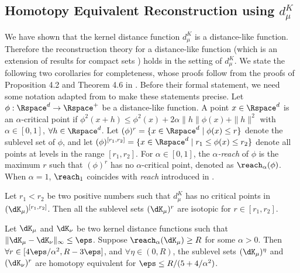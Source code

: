\documentclass[11pt]{myclass}
\begin{document}
\subsection{Homotopy Equivalent Reconstruction using $d^K_{\mu}$}

We have shown that the kernel distance function $d^K_{\mu}$ is a distance-like function.
Therefore the reconstruction theory for a distance-like function \cite{ChazalCohen-SteinerMerigot2011} (which is an extension of results for compact sets \cite{ChazalCohen-SteinerLieutier2009}) 
holds in the setting of $d^K_{\mu}$. 
We state the following two corollaries for completeness, whose proofs follow from the proofs of Proposition 4.2 and Theorem 4.6 in \cite{ChazalCohen-SteinerMerigot2011}.  
Before their formal statement, we need some notation adapted from \cite{ChazalCohen-SteinerMerigot2011} to make these statements precise.
Let $\phi: \Rspace^d \to \Rspace^+$ be a distance-like function. A point $x \in \Rspace^d$ is an $\alpha$-critical point if $\phi^2(x+h) \leq \phi^2(x) + 2\alpha \| h\| \phi(x) + \| h\|^2$ with $\alpha \in [0,1]$, $\forall h \in \Rspace^d$. 
Let $(\phi)^r = \{x \in \Rspace^d \mid \phi(x) \leq r\}$ denote the sublevel set of $\phi$, and let $(\phi)^{[r_1, r_2]} = \{x \in \Rspace^d \mid r_1 \leq \phi(x) \leq r_2\}$ denote all points at levels in the range $[r_1, r_2]$.  
For $\alpha \in [0,1]$, the \emph{$\alpha$-reach} of $\phi$ is the maximum $r$ such that $(\phi)^r$ has no $\alpha$-critical point, denoted as $\reach_{\alpha}(\phi)$.   
When $\alpha=1$, $\reach_1$ coincides with \emph{reach} introduced in \cite{Federer1959}. 


\begin{theorem}
Let $r_1 < r_2$ be two positive numbers such that $d^K_{\mu}$ has no critical points in $(\dK_\mu)^{[r_1,r_2]}$.  
Then all the sublevel sets $(\dK_\mu)^r$ are isotopic for $r \in [r_1, r_2]$. 
\end{theorem}

\begin{theorem}[Reconstruction on $\dK_\mu$]
Let $\dK_\mu$ and $\dK_\nu$ be two kernel distance functions such that
$\|\dK_\mu - \dK_\nu\|_\infty \leq \eps$.  
Suppose $\reach_{\alpha}(\dK_\mu) \geq R$ for some $\alpha > 0$.
Then $\forall r \in [4\eps/\alpha^2, R - 3\eps]$, and $\forall \eta \in (0, R)$, 
the sublevel sets $(\dK_\mu)^\eta$ and $(\dK_\nu)^r$ are homotopy equivalent for $\eps \leq R/(5+4/\alpha^2)$. 
\label{thm:reconstruct}
\end{theorem}
\end{document}
